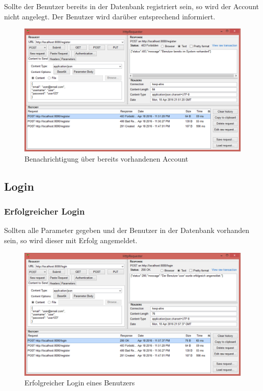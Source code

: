 Sollte der Benutzer bereits in der Datenbank registriert sein, so wird der Account nicht angelegt. Der Benutzer wird darüber entsprechend informiert.

\begin{figure}[H]
	\includegraphics[width=1\textwidth]{images/register_dupl.png}
	\caption{Benachrichtigung über bereits vorhandenen Account}
\end{figure}
\clearpage

\subsection{Login}
\subsubsection{Erfolgreicher Login}

Sollten alle Parameter gegeben und der Benutzer in der Datenbank vorhanden sein, so wird dieser mit Erfolg angemeldet.

\begin{figure}[H]
	\includegraphics[width=1\textwidth]{images/login_ok.png}
	\caption{Erfolgreicher Login eines Benutzers}
\end{figure}
\clearpage

